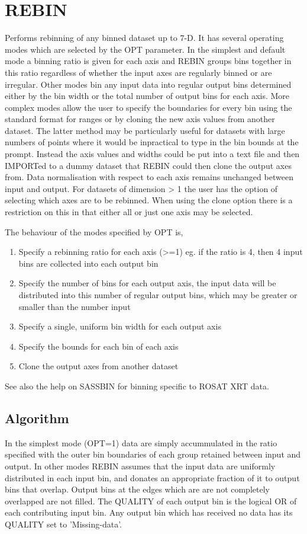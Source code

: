 \documentclass{book}
\renewcommand{\_}{{\tt\char'137}}     %
\begin{document}
\section{REBIN}
Performs rebinning of any binned dataset up to 7-D. It has
several operating modes which are selected by the OPT parameter.
In the simplest and default mode a binning ratio is given
for each axis and REBIN groups bins together in this ratio
regardless of whether the input axes are regularly binned or
are irregular. Other modes bin any input data into regular
output bins determined either by the bin width or the total
number of output bins for each axis. More complex modes
allow the user to specify the boundaries for every bin using
the standard format for ranges or by cloning the new axis
values from another dataset. The latter method may be
particularly useful for datasets with large numbers of points
where it would be inpractical to type in the bin bounds at the
prompt. Instead the axis values and widths could be put into
a text file and then IMPORTed to a dummy dataset that REBIN
could then clone the output axes from. Data normalisation with
respect to each axis remains unchanged between input and output.
For datasets of dimension > 1 the user has the option of selecting
which axes are to be rebinned. When using the clone option there
is a restriction on this in that either all or just one axis may
be selected.
 
The behaviour of the modes specified by OPT is,
 
\begin{enumerate}
\item Specify a rebinning ratio for each axis (>=1)
eg. if the ratio is 4, then 4 input bins are
collected into each output bin
\item Specify the number of bins for each output
axis, the input data will be distributed into
this number of regular output bins, which may
be greater or smaller than the number input
\item Specify a single, uniform bin width for each
output axis
\item Specify the bounds for each bin of each axis
\item Clone the output axes from another dataset
\end{enumerate}
See also the help on SASSBIN for binning specific to
ROSAT XRT data.
 
\subsection{Algorithm}
In the simplest mode (OPT=1) data are simply accummulated in
the ratio specified with the outer bin boundaries of each
group retained between input and output. In other modes
REBIN assumes that the input data are uniformly distributed in
each input bin, and donates an appropriate fraction of it to
output bins that overlap. Output bins at the edges which are
are not completely overlapped are not filled. The QUALITY of
each output bin is the logical OR of each contributing input bin.
Any output bin which has received no data has its QUALITY set
to 'Missing-data'.
 
\end{document}
